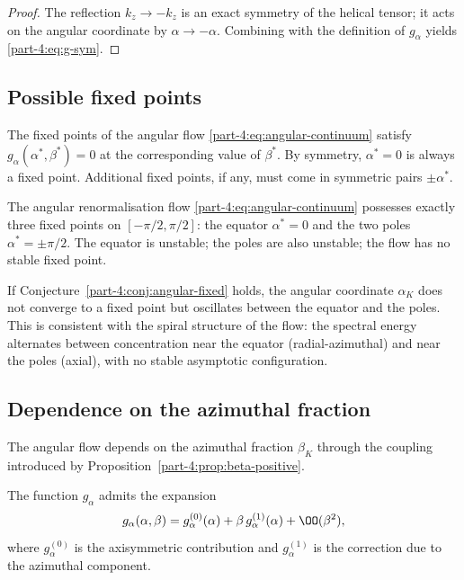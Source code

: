\begin{proof}
The reflection $k_z\to -k_z$ is an exact symmetry of the helical 
tensor; it acts on the angular coordinate by $\alpha\to-\alpha$. 
Combining with the definition of $g_\alpha$ yields \eqref{part-4:eq:g-sym}.
\end{proof}

\subsection{Possible fixed points}
\label{part-4:ssec:angular-fixed}

The fixed points of the angular flow \eqref{part-4:eq:angular-continuum} 
satisfy $g_\alpha(\alpha^\ast,\beta^\ast) = 0$ at the corresponding 
value of $\beta^\ast$. By symmetry, $\alpha^\ast = 0$ is always a 
fixed point. Additional fixed points, if any, must come in symmetric 
pairs $\pm\alpha^\ast$.

\begin{conjecture}\label{part-4:conj:angular-fixed}
The angular renormalisation flow \eqref{part-4:eq:angular-continuum} 
possesses exactly three fixed points on $[-\pi/2,\pi/2]$: the 
equator $\alpha^\ast = 0$ and the two poles $\alpha^\ast = \pm\pi/2$. 
The equator is unstable; the poles are also unstable; the flow has no 
stable fixed point.
\end{conjecture}

\begin{remark}\label{part-4:rem:conj-consequence}
If Conjecture~\ref{part-4:conj:angular-fixed} holds, the angular coordinate 
$\alpha_K$ does not converge to a fixed point but oscillates between 
the equator and the poles. This is consistent with the spiral 
structure of the flow: the spectral energy alternates between 
concentration near the equator (radial-azimuthal) and near the poles 
(axial), with no stable asymptotic configuration.
\end{remark}

\subsection{Dependence on the azimuthal fraction}
\label{part-4:ssec:angular-beta}

The angular flow depends on the azimuthal fraction $\beta_K$ through 
the coupling introduced by Proposition~\ref{part-4:prop:beta-positive}.

\begin{proposition}\label{part-4:prop:beta-coupling}
The function $g_\alpha$ admits the expansion
\begin{equation}\label{part-4:eq:g-beta-exp}
g_\alpha(\alpha,\beta) = g_\alpha^{(0)}(\alpha) + \beta\,g_\alpha^{(1)}(\alpha) + 
\OO(\beta^2),
\end{equation}
where $g_\alpha^{(0)}$ is the axisymmetric contribution and 
$g_\alpha^{(1)}$ is the correction due to the azimuthal component.
\end{proposition}

